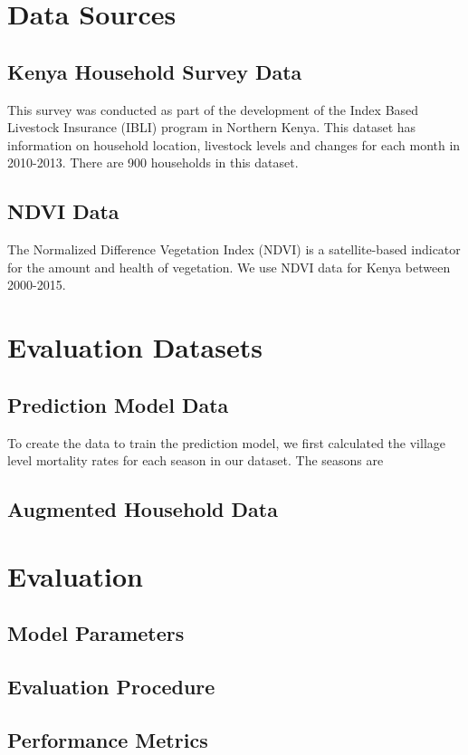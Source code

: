 \documentclass[11pt]{article}
\begin{document}
\section{Data Sources}
  \subsection{Kenya Household Survey Data}
    This survey was conducted as part of the development of the Index Based Livestock Insurance (IBLI) program in Northern Kenya. This dataset has information on household location, livestock levels and changes for each month in 2010-2013. There are 900 households in this dataset.

  \subsection{NDVI Data}
    The Normalized Difference Vegetation Index (NDVI) is a satellite-based indicator for the amount and health of vegetation. We use NDVI data for Kenya between 2000-2015. 

\section{Evaluation Datasets}
  \subsection{Prediction Model Data}
    To create the data to train the prediction model, we first calculated the village level mortality rates for each season in our dataset. The seasons are 
    
  \subsection{Augmented Household Data}

\section{Evaluation}
  \subsection{Model Parameters}

  \subsection{Evaluation Procedure}

  \subsection{Performance Metrics}
\end{document}
